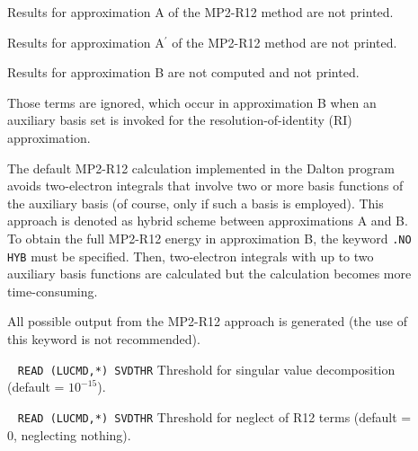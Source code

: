 \begin{description}

\item[]

Results for approximation A of the MP2-R12 method are not printed.

\item[]

Results for approximation A$^\prime$ of the MP2-R12 method are not printed.

\item[]

Results for approximation B are not computed and not printed.

\item[]

Those terms are ignored, which occur in approximation B when an auxiliary basis set
is invoked for the resolution-of-identity (RI) approximation.

\item[]

The default MP2-R12 calculation implemented in the Dalton program
avoids two-electron integrals that involve
two or more basis functions of the auxiliary basis (of course, only
if such a basis is employed). This approach is denoted
as hybrid scheme between approximations A and B. To obtain the
full MP2-R12 energy in approximation B, the keyword \verb|.NO HYB| must
be specified. Then, two-electron integrals with up to two
auxiliary basis functions are calculated but the calculation becomes 
more time-consuming.

\item[]

All possible output from the MP2-R12 approach is generated (the 
use of this keyword is not recommended).

\item[]  \verb| | \newline
\verb|READ (LUCMD,*) SVDTHR|\newline
Threshold for singular value decomposition (default = $10^{-15}$).

\item[]  \verb| | \newline
\verb|READ (LUCMD,*) SVDTHR|\newline
Threshold for neglect of R12 terms (default = 0, neglecting nothing).

\end{description}
